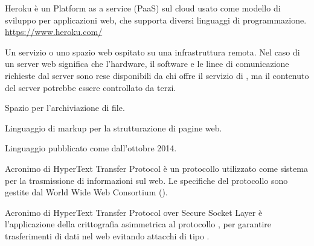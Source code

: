 Heroku è un Platform as a service (PaaS) sul cloud usato come modello di sviluppo per applicazioni web, che supporta diversi linguaggi di programmazione.\\
\url{https://www.heroku.com/}

Un servizio o uno spazio web ospitato su una infrastruttura remota.
Nel caso di un server web significa che l’hardware, il software e le linee di comunicazione richieste dal server sono rese disponibili da chi offre il servizio di , ma il contenuto del server potrebbe essere controllato da terzi.

Spazio per l’archiviazione di file.

Linguaggio di markup per la strutturazione di pagine web.

Linguaggio  pubblicato come  dall'ottobre 2014.

Acronimo di HyperText Transfer Protocol è un protocollo utilizzato come sistema per la trasmissione di informazioni sul web. Le specifiche del protocollo sono gestite dal World Wide Web Consortium ().

Acronimo di  HyperText Transfer Protocol over Secure Socket Layer è l'applicazione della crittografia asimmetrica al protocollo , per garantire trasferimenti di dati nel web evitando attacchi di tipo .
\clearpage